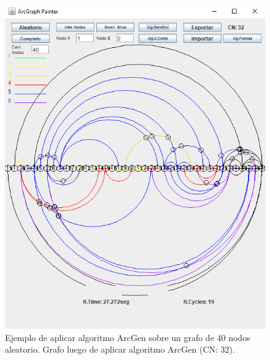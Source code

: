 \begin{figure}
	\centering
	\includegraphics[scale=0.7]{imagenes/grafo_example_ori_gen.png}
	
	\caption{Ejemplo de aplicar algoritmo ArcGen sobre un grafo de 40 nodos aleatorio. Grafo luego de aplicar algoritmo ArcGen (CN: 32).}
	\label{fig2:resultado_ejemplo_grafo_ori_gen}
\end{figure}



